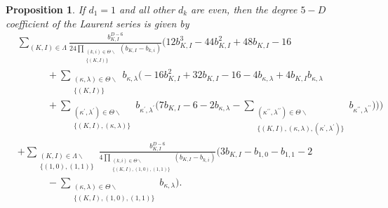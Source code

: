 \documentclass{amsart}
\newtheorem{proposition}[theorem]{Proposition}
\theoremstyle{definition}
\theoremstyle{remark}
\begin{document}
\begin{proposition}
If $d_1 = 1$ and all other $d_k$ are even, then the degree $5-D$ coefficient of the
Laurent series is given by
\begin{align}
    \label{eq:Gamma2FirstCase2}
&\sum\limits_{(K,I)\in\Lambda}
        \frac{b_{K,I}^{D-6}}
        {24 \prod\limits_{\substack{(k,i)\in\Theta\smallsetminus \\ \{ (K,I)\} }} (b_{K,I} - b_{k,i})}
        \bigg(  12b_{K,I}^3 - 44b_{K,I}^2 + 48b_{K,I} - 16
                \\ \nonumber &\quad\quad\quad +
                \sum\limits_{\substack{(\kappa,\lambda)\in\Theta\smallsetminus \\ \{ (K,I)\} }} b_{\kappa,\lambda} \Big(
                    - 16b_{K,I}^2 + 32 b_{K,I} - 16
                        - 4 b_{\kappa,\lambda} + 4 b_{K,I} b_{\kappa,\lambda}
                \\ \nonumber &\quad\quad\quad
                    + \sum\limits_{\substack{(\kappa^\prime,\lambda^\prime)\in\Theta\smallsetminus
                            \\ \{(K,I),(\kappa,\lambda)\}}} b_{\kappa^\prime,\lambda^\prime} \Big(
                        7 b_{K,I}
                        - 6
                        - 2 b_{\kappa,\lambda}
                        -  \sum\limits_{\substack{(\kappa^{\prime\prime},\lambda^{\prime\prime})\in\Theta\smallsetminus
                            \\ \{(K,I),(\kappa,\lambda),(\kappa^{\prime},\lambda^{\prime})\}}}
                            b_{\kappa^{\prime\prime},\lambda^{\prime\prime}}
        \Big) \Big)\bigg)
        \\ \nonumber &
        +
        \sum\limits_{\substack{(K,I)\in\Lambda\smallsetminus \\ \{ (1,0), (1,1) \} }}
        \frac{b_{K,I}^{D-6}}
            {4\prod\limits_{\substack{(k,i)\in\Theta\smallsetminus \\ \{ (K,I), (1,0), (1,1) \} }} (b_{K,I} - b_{k,i})}
            \Big( 3 b_{K,I} - b_{1,0} - b_{1,1} - 2
        \\ \nonumber &\quad\quad\quad
                - \sum\limits_{\substack{(\kappa,\lambda)\in\Theta\smallsetminus \\ \{ (K,I), (1,0), (1,1) \} }}
                b_{\kappa,\lambda} \Big).
\end{align}
\end{proposition}
\end{document}
